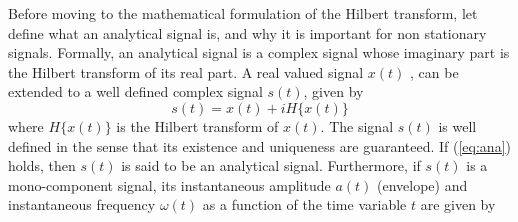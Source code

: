 \documentclass[../Main/thesis.tex]{subfiles}
\begin{document}
\justify
Before moving to the mathematical formulation of the Hilbert transform, let define what an analytical signal is, and why it is important for non stationary signals.
Formally, an analytical signal is a complex signal whose imaginary part is the Hilbert transform of its real part. A real valued signal $x(t)$ , can be extended to a well defined complex signal $s(t)$, given by
\begin{equation}\label{eq:ana}
s(t) = x(t) + i H\{ x(t)\}
\end{equation}
where $H\{ x(t)\}$ is the Hilbert transform of $x(t)$. The signal $s(t)$ is well defined in the sense that its existence and uniqueness are guaranteed. If (\ref{eq:ana}) holds, then $s(t)$ is said to be an analytical signal. Furthermore, if $s(t)$ is a mono-component signal, its instantaneous amplitude $a(t)$ (envelope) and instantaneous frequency $\omega(t)$ as a function of the time variable $t$ are given by
\end{document}
